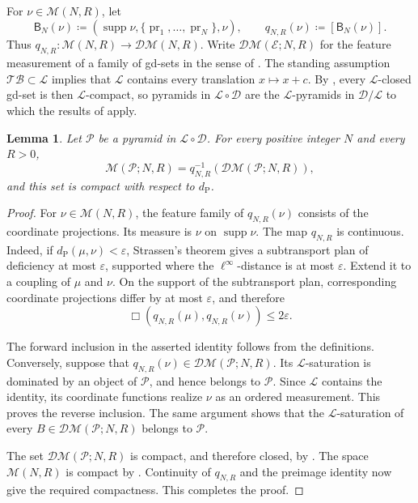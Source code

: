 \documentclass{amsart}
\theoremstyle{plain}
\newtheorem{lemma}[theorem]{Lemma}
\theoremstyle{definition}
\theoremstyle{remark}
\newcommand{\D}{\mathcal{D}}
\newcommand{\M}{\mathcal{M}}
\newcommand{\DM}{\mathcal{DM}}
\renewcommand{\L}{\mathcal{L}}
\newcommand{\TB}{\mathcal{TB}}
\DeclareMathOperator{\supp}{supp}
\DeclareMathOperator{\pr}{pr}
\newcommand{\dpr}{d_{\operatorname{P}}}
\begin{document}
For $\nu\in\M(N,R)$, let
\[\mathsf B_N(\nu)\coloneqq(\supp\nu,\{\pr_1,\ldots,\pr_N\},\nu),\qquad q_{N,R}(\nu)\coloneqq[\mathsf B_N(\nu)].\]
Thus $q_{N,R}\colon\M(N,R)\to\DM(N,R)$.  Write $\DM(\mathcal E;N,R)$ for the feature measurement of a family of gd-sets
in the sense of \cite[Definition~4.3]{gds2}.
The standing assumption $\TB\subset\L$ implies that $\L$ contains every translation $x\mapsto x+c$.
By \cite[Theorem~3.19]{gds2}, every $\L$-closed gd-set is then
$\L$-compact, so pyramids in $\L\circ\D$ are the $\L$-pyramids in
$\D/\L$ to which the results of \cite{gds2} apply.

\begin{lemma}
\label{lem:pyramid-measurement-compactness}
Let $\mathcal P$ be a pyramid in $\L\circ\D$.  For every positive integer
$N$ and every $R>0$,
\[\M(\mathcal P;N,R)=q_{N,R}^{-1}(\DM(\mathcal P;N,R)),\]
and this set is compact with respect to $\dpr$.
\end{lemma}

\begin{proof}
For $\nu\in\M(N,R)$, the feature family of $q_{N,R}(\nu)$ consists of the
coordinate projections.  Its measure is $\nu$ on $\supp\nu$.  The map
$q_{N,R}$ is continuous.  Indeed, if $\dpr(\mu,\nu)<\varepsilon$, Strassen's
theorem \cite[Theorem~1.22]{shioya2016mmg} gives a subtransport plan of
deficiency at most $\varepsilon$, supported where the $\ell^\infty$-distance
is at most $\varepsilon$.  Extend it to a coupling of $\mu$ and $\nu$.  On
the support of the subtransport plan, corresponding coordinate projections
differ by at most $\varepsilon$, and therefore
\[\Box(q_{N,R}(\mu),q_{N,R}(\nu))\leq2\varepsilon.\]

The forward inclusion in the asserted identity follows from the definitions.
Conversely, suppose that $q_{N,R}(\nu)\in\DM(\mathcal P;N,R)$.  Its
$\L$-saturation is dominated by an object of $\mathcal P$, and hence belongs
to $\mathcal P$.  Since $\L$ contains the identity, its coordinate functions
realize $\nu$ as an ordered measurement.  This proves the reverse inclusion.
The same argument shows that the $\L$-saturation of every
$B\in\DM(\mathcal P;N,R)$ belongs to $\mathcal P$.

The set $\DM(\mathcal P;N,R)$ is compact, and therefore closed, by \cite[Lemma~7.1]{gds2}.  The space $\M(N,R)$ is compact by
\cite[Lemma~1.17(3) and Definition~5.37]{shioya2016mmg}.
Continuity of $q_{N,R}$ and the preimage identity now give the required compactness.  This completes the proof.
\end{proof}
\end{document}
